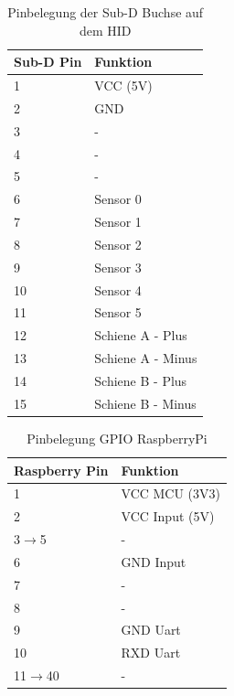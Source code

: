\documentclass[a4paper, 11pt]{report}
\begin{document}
	\begin{table}[H]
	\centering
		\begin{tabular}{|l|l|}
			\hline
			\textbf{Sub-D Pin} &\textbf{Funktion}\\
			\hline
			\hline
			1 & VCC (5V)\\
			\hline
			2 & GND\\
			\hline
			3 & -\\
			\hline
			4 & -\\
			\hline
			5 & -\\
			\hline
			6 & Sensor 0\\
			\hline
			7 & Sensor 1\\
			\hline
			8 & Sensor 2\\
			\hline
			9 & Sensor 3\\
			\hline
			10 & Sensor 4\\
			\hline
			11 & Sensor 5\\
			\hline
			12 & Schiene A - Plus\\
			\hline
			13 & Schiene A - Minus\\
			\hline
			14 & Schiene B - Plus\\
			\hline
			15 & Schiene B - Minus\\
			\hline
		\end{tabular}
		\caption{Pinbelegung der Sub-D Buchse auf dem HID}
		\label{tab:AnhangBelegungSUBD}
	\end{table}

	\begin{table}[H]
	\centering
		\begin{tabular}{|l|l|}
			\hline
			\textbf{Raspberry Pin} &\textbf{Funktion}\\
			\hline
			\hline
			1 & VCC MCU (3V3)\\
			\hline
			2 & VCC Input (5V)\\
			\hline
			3$\rightarrow$5 & -\\
			\hline
			6 & GND Input\\
			\hline
			7 & -\\
			\hline
			8 & -\\
			\hline
			9 & GND Uart\\
			\hline
			10 & RXD Uart\\
			\hline
			11$\rightarrow$40 & -\\
			\hline
		\end{tabular}
		\caption{Pinbelegung GPIO RaspberryPi}
		\label{tab:AnhangBelegungRPI}
	\end{table}
\end{document}
